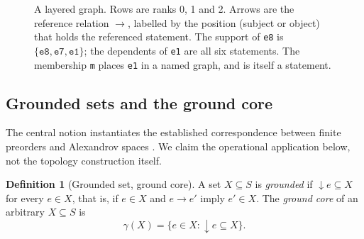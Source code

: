 \documentclass[11pt]{article}
\theoremstyle{plain}
\theoremstyle{definition}
\newtheorem{definition}{Definition}
\theoremstyle{remark}
\newcommand{\refs}{\rightarrow}          %
\newcommand{\supp}{{\downarrow}}          %
\newcommand{\core}{\gamma}               %
\begin{document}
\begin{figure}[t]
\centering
{}
\caption{A layered graph. Rows are ranks 0, 1 and 2. Arrows are the reference
relation $\refs$, labelled by the position (subject or object) that holds the
referenced statement. The
support of \texttt{e8} is $\{\texttt{e8},\texttt{e7},\texttt{e1}\}$; the
dependents of \texttt{e1} are all six statements. The membership \texttt{m}
places \texttt{e1} in a named graph, and is itself a statement.}
\label{fig:layers}
\end{figure}

\subsection{Grounded sets and the ground core}

The central notion instantiates the established correspondence between finite
preorders and Alexandrov spaces \cite{barmak2011finite}. We claim the operational
application below, not the topology construction itself.

\begin{definition}[Grounded set, ground core]
A set $X\subseteq S$ is \emph{grounded} if $\supp e\subseteq X$ for every
$e\in X$, that is, if $e\in X$ and $e\refs e'$ imply $e'\in X$. The
\emph{ground core} of an arbitrary $X\subseteq S$ is
\[\core(X)=\{e\in X : \supp e\subseteq X\}.\]
\end{definition}
\end{document}
